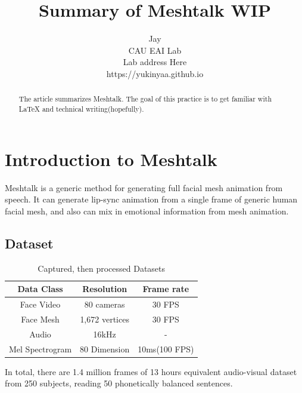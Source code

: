 \documentclass[10pt,twocolumn,letterpaper]{article}
\begin{document}
  \title{Summary of Meshtalk WIP}

  \author{Jay \\
    CAU EAI Lab \\
    Lab address Here\\
    {https://yukinyaa.github.io}
  }
  \maketitle
  \thispagestyle{empty}

  \begin{abstract}
    The article summarizes Meshtalk\cite{richard2021meshtalk}.
    The goal of this practice is to get familiar with \LaTeX{} and technical writing(hopefully).
  \end{abstract}


  \section{Introduction to Meshtalk}
    Meshtalk is a generic method for generating full facial mesh animation from speech. It can generate lip-sync animation from a single frame of generic human facial mesh, and also can mix in emotional information from mesh animation.

      
    \subsection{Dataset}
      \begin{table}
        \begin{center}
          \begin{tabular}{|c||c c|}
              \hline
                Data Class & Resolution & Frame rate \\
              \hline\hline
                Face Video & 80 cameras & 30 FPS \\
                Face Mesh & 1,672 vertices & 30 FPS \\
              \hline
                Audio & 16kHz & - \\
                Mel Spectrogram & 80 Dimension & 10ms(100 FPS) \\
              \hline
          \end{tabular}
        \end{center}
        \caption{Captured, then processed Datasets}
        \label{table:dataset}
      \end{table}
      In total, there are 1.4 million frames of  13 hours equivalent audio-visual dataset from 250 subjects, reading 50 phonetically balanced sentences.
\end{document}
